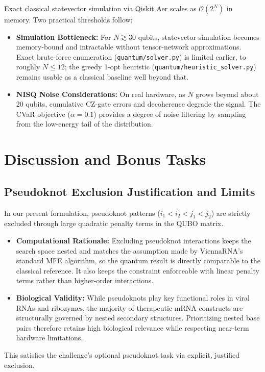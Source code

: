 \documentclass[11pt,a4paper]{article}
\begin{document}
	Exact classical statevector simulation via Qiskit Aer scales as $\mathcal{O}(2^N)$ in memory. Two practical thresholds follow:
	\begin{itemize}[leftmargin=1.2cm]
		\item \textbf{Simulation Bottleneck:} For $N \gtrsim 30$ qubits, statevector simulation becomes memory-bound and intractable without tensor-network approximations. Exact brute-force enumeration (\texttt{quantum/solver.py}) is limited earlier, to roughly $N \le 12$; the greedy 1-opt heuristic (\texttt{quantum/heuristic\_solver.py}) remains usable as a classical baseline well beyond that.
		\item \textbf{NISQ Noise Considerations:} On real hardware, as $N$ grows beyond about 20 qubits, cumulative CZ-gate errors and decoherence degrade the signal. The CVaR objective ($\alpha = 0.1$) provides a degree of noise filtering by sampling from the low-energy tail of the distribution.
	\end{itemize}
	
	\clearpage
	
	\section{Discussion and Bonus Tasks}
	\label{sec:discussion}
	
	\subsection{Pseudoknot Exclusion Justification and Limits}
	
	In our present formulation, pseudoknot patterns ($i_1 < i_2 < j_1 < j_2$) are strictly excluded through large quadratic penalty terms in the QUBO matrix.
	\begin{itemize}[leftmargin=1.2cm]
		\item \textbf{Computational Rationale:} Excluding pseudoknot interactions keeps the search space nested and matches the assumption made by ViennaRNA's standard MFE algorithm, so the quantum result is directly comparable to the classical reference. It also keeps the constraint enforceable with linear penalty terms rather than higher-order interactions.
		\item \textbf{Biological Validity:} While pseudoknots play key functional roles in viral RNAs and ribozymes, the majority of therapeutic mRNA constructs are structurally governed by nested secondary structures. Prioritizing nested base pairs therefore retains high biological relevance while respecting near-term hardware limitations.
	\end{itemize}
	This satisfies the challenge's optional pseudoknot task via explicit, justified exclusion.
	
\end{document}
